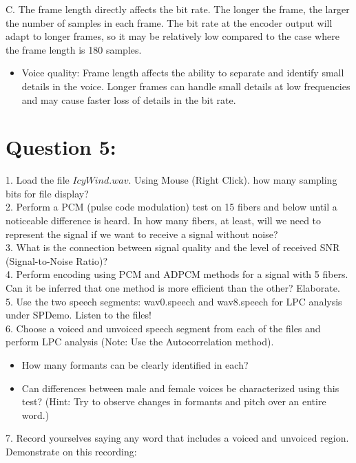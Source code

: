 \documentclass[letterpaper, 12pt]{article}
\begin{document}
   C. The frame length directly affects the bit rate. The longer the frame, the larger the number of samples in each frame. The bit rate at the encoder output will adapt to longer frames, so it may be relatively low compared to the case where the frame length is 180 samples.
   \begin{itemize}
       \item Voice quality: Frame length affects the ability to separate and identify small details in the voice. Longer frames can handle small details at low frequencies and may cause faster loss of details in the bit rate.
   \end{itemize}

\newpage

\section*{Question 5:}
1. Load the file $IcyWind.wav$. Using Mouse (Right Click).  how many sampling bits for file display? \\
2. Perform a PCM (pulse code modulation) test on 15 fibers and below until a noticeable difference is heard. In how many fibers, at least, will we need to represent the signal if we want to receive a signal without noise? \\
3. What is the connection between signal quality and the level of received SNR (Signal-to-Noise Ratio)? \\
4. Perform encoding using PCM and ADPCM methods for a signal with 5 fibers. Can it be inferred that one method is more efficient than the other? Elaborate.\\
5. Use the two speech segments: wav0.speech and wav8.speech for LPC analysis under SPDemo. Listen to the files! \\
6. Choose a voiced and unvoiced speech segment from each of the files and perform LPC analysis (Note: Use the Autocorrelation method). \\
\begin{itemize}
  \item How many formants can be clearly identified in each?\\
  \item Can differences between male and female voices be characterized using this test? (Hint: Try to observe changes in formants and pitch over an entire word.) \\
\end{itemize}
7. Record yourselves saying any word that includes a voiced and unvoiced region. Demonstrate on this recording: \\
\end{document}
